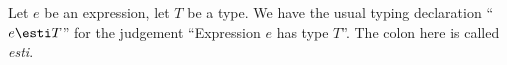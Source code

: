 \begin{node}\label{sml-000C}%
Let $e$ be an expression, let $T$ be a type. We have the usual typing
declaration ``$e\esti T$'' for the judgement ``Expression $e$ has type $T$''.
The colon here is called \textit{esti}.
\end{node}
